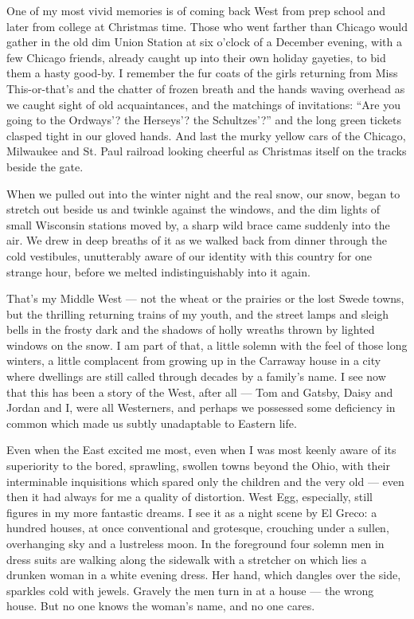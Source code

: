 \documentclass{znotebook}
\begin{document}
One of my most vivid memories is of coming back West from prep school and later from college at Christmas time. Those who went farther than Chicago would gather in the old dim Union Station at six o'clock of a December evening, with a few Chicago friends, already caught up into their own holiday gayeties, to bid them a hasty good-by. I remember the fur coats of the girls returning from Miss This-or-that's and the chatter of frozen breath and the hands waving overhead as we caught sight of old acquaintances, and the matchings of invitations: ``Are you going to the Ordways'? the Herseys'? the Schultzes'?'' and the long green tickets clasped tight in our gloved hands. And last the murky yellow cars of the Chicago, Milwaukee and St. Paul railroad looking cheerful as Christmas itself on the tracks beside the gate.

When we pulled out into the winter night and the real snow, our snow, began to stretch out beside us and twinkle against the windows, and the dim lights of small Wisconsin stations moved by, a sharp wild brace came suddenly into the air. We drew in deep breaths of it as we walked back from dinner through the cold vestibules, unutterably aware of our identity with this country for one strange hour, before we melted indistinguishably into it again.

That's my Middle West ---{} not the wheat or the prairies or the lost Swede towns, but the thrilling returning trains of my youth, and the street lamps and sleigh bells in the frosty dark and the shadows of holly wreaths thrown by lighted windows on the snow. I am part of that, a little solemn with the feel of those long winters, a little complacent from growing up in the Carraway house in a city where dwellings are still called through decades by a family's name. I see now that this has been a story of the West, after all ---{} Tom and Gatsby, Daisy and Jordan and I, were all Westerners, and perhaps we possessed some deficiency in common which made us subtly unadaptable to Eastern life.

Even when the East excited me most, even when I was most keenly aware of its superiority to the bored, sprawling, swollen towns beyond the Ohio, with their interminable inquisitions which spared only the children and the very old ---{} even then it had always for me a quality of distortion. West Egg, especially, still figures in my more fantastic dreams. I see it as a night scene by El Greco: a hundred houses, at once conventional and grotesque, crouching under a sullen, overhanging sky and a lustreless moon. In the foreground four solemn men in dress suits are walking along the sidewalk with a stretcher on which lies a drunken woman in a white evening dress. Her hand, which dangles over the side, sparkles cold with jewels. Gravely the men turn in at a house ---{} the wrong house. But no one knows the woman's name, and no one cares.
\end{document}
